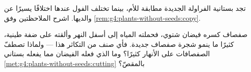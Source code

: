 \begin{exercise}[$\star\star$]\label{exo:g4:plants-without-seeds:10}
تجد بستانية  الفراولة الجديدة مطابقة للأم، بينما تختلف 
الفول عندها اختلافًا يسيرًا عن والديها. اشرح الملاحظتين وفق
\cref{rem:g4:plants-without-seeds:copy}.
\end{exercise}

\begin{exercise}[$\star\star\star$]\label{exo:g4:plants-without-seeds:11}
 صفصاف كسره فيضان شتوي، فحملته المياه إلى أسفل النهر وألقته
على ضفة طينية، كثيرًا ما ينمو شجرة صفصاف جديدة. فأي صنف من
التكاثر هذا --- ولماذا تصطفّ الصفصافات على الأنهار كثيرًا؟ وما
الذي فعله الفيضان مما يفعله بستاني
\cref{met:g4:plants-without-seeds:cutting} بالمقصّ؟
\end{exercise}
